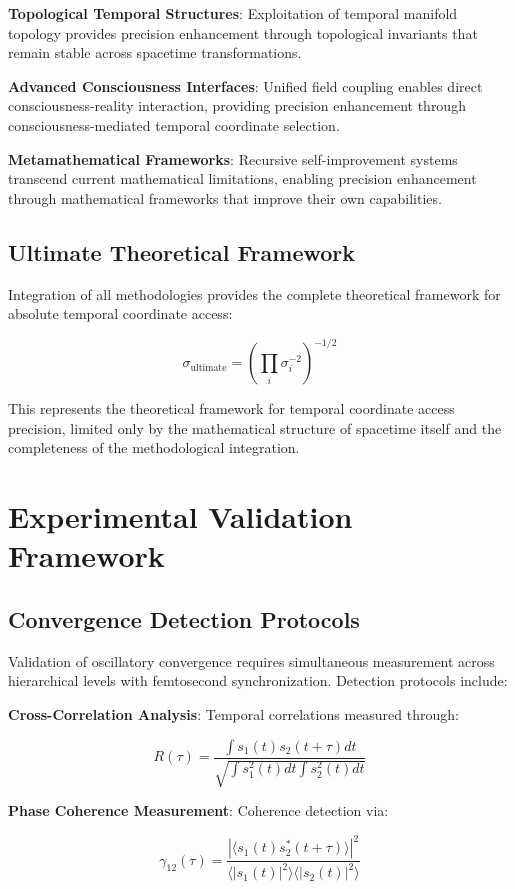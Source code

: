 \documentclass[11pt]{article}
\theoremstyle{remark}
\begin{document}
\textbf{Topological Temporal Structures}: Exploitation of temporal manifold topology provides precision enhancement through topological invariants that remain stable across spacetime transformations.

\textbf{Advanced Consciousness Interfaces}: Unified field coupling enables direct consciousness-reality interaction, providing precision enhancement through consciousness-mediated temporal coordinate selection.

\textbf{Metamathematical Frameworks}: Recursive self-improvement systems transcend current mathematical limitations, enabling precision enhancement through mathematical frameworks that improve their own capabilities.

\subsection{Ultimate Theoretical Framework}

Integration of all methodologies provides the complete theoretical framework for absolute temporal coordinate access:

$$\sigma_{\text{ultimate}} = \left(\prod_{i} \sigma_i^{-2}\right)^{-1/2}$$

This represents the theoretical framework for temporal coordinate access precision, limited only by the mathematical structure of spacetime itself and the completeness of the methodological integration.

\section{Experimental Validation Framework}

\subsection{Convergence Detection Protocols}

Validation of oscillatory convergence requires simultaneous measurement across hierarchical levels with femtosecond synchronization. Detection protocols include:

\textbf{Cross-Correlation Analysis}: Temporal correlations measured through:

$$R(\tau) = \frac{\int s_1(t)s_2(t+\tau) dt}{\sqrt{\int s_1^2(t) dt \int s_2^2(t) dt}}$$

\textbf{Phase Coherence Measurement}: Coherence detection via:

$$\gamma_{12}(\tau) = \frac{|\langle s_1(t)s_2^*(t+\tau)\rangle|^2}{\langle |s_1(t)|^2\rangle\langle |s_2(t)|^2\rangle}$$
\end{document}
